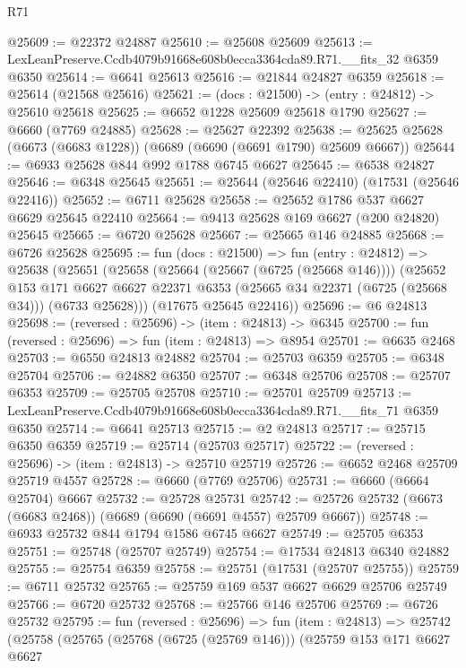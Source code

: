 \begin{lexlean}{R71}
\begin{coremodule}
@25609 := @22372 @24887
@25610 := @25608 @25609
@25613 := LexLeanPreserve.Ccdb4079b91668e608b0ecca3364cda89.R71.__fits_32 @6359 @6350
@25614 := @6641 @25613
@25616 := @21844 @24827 @6359
@25618 := @25614 (@21568 @25616)
@25621 := (docs : @21500) -> (entry : @24812) -> @25610 @25618
@25625 := @6652 @1228 @25609 @25618 @1790
@25627 := @6660 (@7769 @24885)
@25628 := @25627 @22392
@25638 := @25625 @25628 (@6673 (@6683 @1228)) (@6689 (@6690 (@6691 @1790) @25609 @6667))
@25644 := @6933 @25628 @844 @992 @1788 @6745 @6627
@25645 := @6538 @24827
@25646 := @6348 @25645
@25651 := @25644 (@25646 @22410) (@17531 (@25646 @22416))
@25652 := @6711 @25628
@25658 := @25652 @1786 @537 @6627 @6629 @25645 @22410
@25664 := @9413 @25628 @169 @6627 (@200 @24820) @25645
@25665 := @6720 @25628
@25667 := @25665 @146 @24885
@25668 := @6726 @25628
@25695 := fun (docs : @21500) =>
  fun (entry : @24812) =>
  @25638
    (@25651
      (@25658
        (@25664 (@25667 (@6725 (@25668 @146))))
        (@25652
          @153
          @171
          @6627
          @6627
          @22371
          @6353
          (@25665 @34 @22371 (@6725 (@25668 @34)))
          (@6733 @25628)))
      (@17675 @25645 @22416))
@25696 := @6 @24813
@25698 := (reversed : @25696) -> (item : @24813) -> @6345
@25700 := fun (reversed : @25696) => fun (item : @24813) => @8954
@25701 := @6635 @2468
@25703 := @6550 @24813 @24882
@25704 := @25703 @6359
@25705 := @6348 @25704
@25706 := @24882 @6350
@25707 := @6348 @25706
@25708 := @25707 @6353
@25709 := @25705 @25708
@25710 := @25701 @25709
@25713 := LexLeanPreserve.Ccdb4079b91668e608b0ecca3364cda89.R71.__fits_71 @6359 @6350
@25714 := @6641 @25713
@25715 := @2 @24813
@25717 := @25715 @6350 @6359
@25719 := @25714 (@25703 @25717)
@25722 := (reversed : @25696) -> (item : @24813) -> @25710 @25719
@25726 := @6652 @2468 @25709 @25719 @4557
@25728 := @6660 (@7769 @25706)
@25731 := @6660 (@6664 @25704) @6667
@25732 := @25728 @25731
@25742 := @25726 @25732 (@6673 (@6683 @2468)) (@6689 (@6690 (@6691 @4557) @25709 @6667))
@25748 := @6933 @25732 @844 @1794 @1586 @6745 @6627
@25749 := @25705 @6353
@25751 := @25748 (@25707 @25749)
@25754 := @17534 @24813 @6340 @24882
@25755 := @25754 @6359
@25758 := @25751 (@17531 (@25707 @25755))
@25759 := @6711 @25732
@25765 := @25759 @169 @537 @6627 @6629 @25706 @25749
@25766 := @6720 @25732
@25768 := @25766 @146 @25706
@25769 := @6726 @25732
@25795 := fun (reversed : @25696) =>
  fun (item : @24813) =>
  @25742
    (@25758
      (@25765
        (@25768 (@6725 (@25769 @146)))
        (@25759
          @153
          @171
          @6627
          @6627

\end{coremodule}
\end{lexlean}
